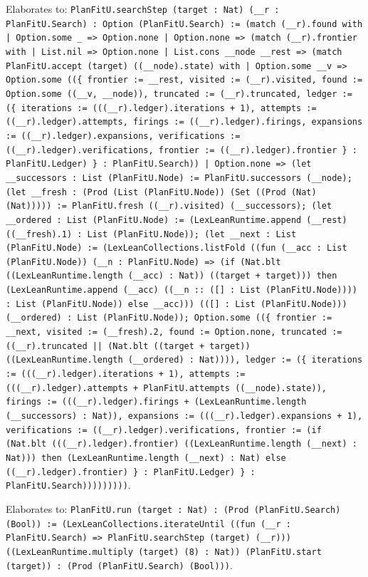 \documentclass[11pt]{article}
\begin{document}
\noindent Elaborates to: \texttt{PlanFitU.searchStep (target : Nat) (\_\_r : PlanFitU.Search) : Option (PlanFitU.Search) := (match (\_\_r).found with | Option.some \_ => Option.none | Option.none => (match (\_\_r).frontier with | List.nil => Option.none | List.cons \_\_node \_\_rest => (match PlanFitU.accept (target) ((\_\_node).state) with | Option.some \_\_v => Option.some ((\{ frontier := \_\_rest, visited := (\_\_r).visited, found := Option.some ((\_\_v, \_\_node)), truncated := (\_\_r).truncated, ledger := (\{ iterations := (((\_\_r).ledger).iterations + 1), attempts := ((\_\_r).ledger).attempts, firings := ((\_\_r).ledger).firings, expansions := ((\_\_r).ledger).expansions, verifications := ((\_\_r).ledger).verifications, frontier := ((\_\_r).ledger).frontier \} : PlanFitU.Ledger) \} : PlanFitU.Search)) | Option.none => (let \_\_successors : List (PlanFitU.Node) := PlanFitU.successors (\_\_node); (let \_\_fresh : (Prod (List (PlanFitU.Node)) (Set ((Prod (Nat) (Nat))))) := PlanFitU.fresh ((\_\_r).visited) (\_\_successors); (let \_\_ordered : List (PlanFitU.Node) := (LexLeanRuntime.append (\_\_rest) ((\_\_fresh).1) : List (PlanFitU.Node)); (let \_\_next : List (PlanFitU.Node) := (LexLeanCollections.listFold ((fun (\_\_acc : List (PlanFitU.Node)) (\_\_n : PlanFitU.Node) => (if (Nat.blt ((LexLeanRuntime.length (\_\_acc) : Nat)) ((target + target))) then (LexLeanRuntime.append (\_\_acc) ((\_\_n :: ([] : List (PlanFitU.Node)))) : List (PlanFitU.Node)) else \_\_acc))) (([] : List (PlanFitU.Node))) (\_\_ordered) : List (PlanFitU.Node)); Option.some ((\{ frontier := \_\_next, visited := (\_\_fresh).2, found := Option.none, truncated := ((\_\_r).truncated || (Nat.blt ((target + target)) ((LexLeanRuntime.length (\_\_ordered) : Nat)))), ledger := (\{ iterations := (((\_\_r).ledger).iterations + 1), attempts := (((\_\_r).ledger).attempts + PlanFitU.attempts ((\_\_node).state)), firings := (((\_\_r).ledger).firings + (LexLeanRuntime.length (\_\_successors) : Nat)), expansions := (((\_\_r).ledger).expansions + 1), verifications := ((\_\_r).ledger).verifications, frontier := (if (Nat.blt (((\_\_r).ledger).frontier) ((LexLeanRuntime.length (\_\_next) : Nat))) then (LexLeanRuntime.length (\_\_next) : Nat) else ((\_\_r).ledger).frontier) \} : PlanFitU.Ledger) \} : PlanFitU.Search)))))))))}.\par
\noindent Elaborates to: \texttt{PlanFitU.run (target : Nat) : (Prod (PlanFitU.Search) (Bool)) := (LexLeanCollections.iterateUntil ((fun (\_\_r : PlanFitU.Search) => PlanFitU.searchStep (target) (\_\_r))) ((LexLeanRuntime.multiply (target) (8) : Nat)) (PlanFitU.start (target)) : (Prod (PlanFitU.Search) (Bool)))}.\par
\end{document}

